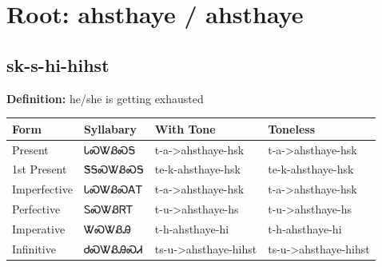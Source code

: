\documentclass{article}%
\begin{document}
%
\normalsize%
\section*{Root: ahsthaye / ahsthaye}%
\subsection*{sk-s-hi-hihst}%
\textbf{Definition: }%
he/she is getting exhausted%
\\[0.5em]%
\begin{tabular}{|l|l|l|l|}%
\hline%
\textbf{Form}&\textbf{Syllabary}&\textbf{With Tone}&\textbf{Toneless}\\%
\hline%
Present&ᏓᏍᏔᏰᏍᎦ&t{-}a{-}>ahsthaye{-}hsk&t{-}a{-}>ahsthaye{-}hsk\\%
1st Present&ᏕᎦᏍᏔᏰᏍᎦ&te{-}k{-}ahsthaye{-}hsk&te{-}k{-}ahsthaye{-}hsk\\%
Imperfective&ᏓᏍᏔᏰᏍᎪᎢ&t{-}a{-}>ahsthaye{-}hsk&t{-}a{-}>ahsthaye{-}hsk\\%
Perfective&ᏚᏍᏔᏰᏒᎢ&t{-}u{-}>ahsthaye{-}hs&t{-}u{-}>ahsthaye{-}hs\\%
Imperative&ᏔᏍᏔᏰᎯ&t{-}h{-}ahsthaye{-}hi&t{-}h{-}ahsthaye{-}hi\\%
Infinitive&ᏧᏍᏔᏰᎯᏍᏗ&ts{-}u{-}>ahsthaye{-}hihst&ts{-}u{-}>ahsthaye{-}hihst\\%
\hline%
\end{tabular}%
\\[1em]%
\end{document}
